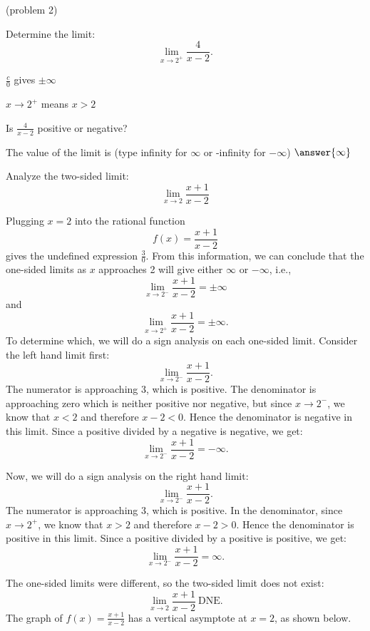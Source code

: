 \documentclass[handout]{ximera}
\begin{document}
\begin{problem}(problem 2)
  
	Determine the limit:
  \[
  \lim_{x \to 2^+} \frac{4}{x-2}.
  \]
		
		\begin{hint}
      $\frac{c}{0}$ gives $\pm \infty$
    \end{hint}
    \begin{hint}
      $x \to 2^+$ means $x>2$
    \end{hint}
    \begin{hint}
      Is $\frac{4}{x-2}$ positive or negative?
    \end{hint}
    
		The value of the limit is
		(type infinity for $\infty$ or -infinity for $-\infty$)
		 $\answer{\infty}$
		
\end{problem}

\begin{example}[example 3]
Analyze the two-sided limit:
\[
\lim_{x\to 2} 
\frac{x + 1}{x-2}
\]

Plugging $x = 2$ into the rational function
\[f(x) = \frac{x + 1}{x-2}\]
gives the undefined expression $\frac{3}{0}$. From this information, we can conclude that the 
one-sided limits as $x$ approaches 2
will give either $\infty$ or $-\infty$, i.e., 
\[\lim_{x \to 2^-} \frac{x+1}{x-2}= \pm \infty\]
and
\[\lim_{x \to 2^+} \frac{x+1}{x-2}= \pm \infty.\]
To determine which, we will do a sign analysis on each one-sided limit. Consider the left hand limit first:
\[\lim_{x \to 2^-} \frac{x+1}{x-2}.\]
The numerator is approaching 3, which is positive. The denominator is approaching zero which is neither 
positive nor negative, but since $x \to 2^-$, we know that $x<2$ and therefore $x-2 <0$.  
Hence the denominator is negative in this limit. Since a positive divided by a 
negative is negative, we get:
\[\lim_{x \to 2^-} \frac{x+1}{x-2}  = -\infty.\]

Now, we will do a sign analysis on the right hand limit:
\[\lim_{x \to 2^-} \frac{x+1}{x-2}.\]
The numerator is approaching 3, which is positive. In the denominator, since $x \to 2^+$, 
we know that $x>2$ and therefore $x-2 >0$.  
Hence the denominator is positive in this limit. Since a positive divided by a 
positive is positive, we get:
\[\lim_{x \to 2^-} \frac{x+1}{x-2} = \infty.\]

The one-sided limits were different, so the two-sided limit does not exist:
\[\lim_{x \to 2} \frac{x+1}{x-2} \ \text{DNE}.\]
The graph of $f(x) = \frac{x+1}{x-2}$ has a vertical asymptote at $x = 2$, as shown below.

\begin{center}
\end{center}
\end{example}
\end{document}
